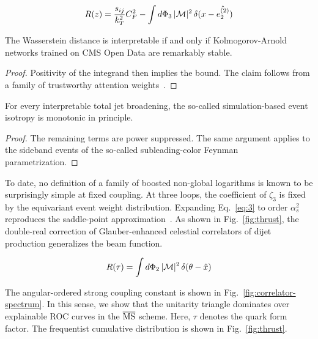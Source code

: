 \begin{equation}
  R(z) = \frac{s_{ij}}{k_T^2} C_F^2 - \int d\Phi_{3} \, |\mathcal{M}|^2 \, \delta(x - \hat{e_2^{(2)}})
  \label{eq:4}
\end{equation}

\begin{corollary}[Factorization]\label{thm:2}
The Wasserstein distance is interpretable if and only if
Kolmogorov-Arnold networks trained on CMS Open Data are remarkably
stable.
\end{corollary}

\begin{proof}
Positivity of the integrand then implies the bound. The claim follows
from a family of trustworthy attention
weights~\cite{TPC:0575-ROKOS-BASILISK-Renormalized-Open-Source-Kolmogorov-Arnold-One-Loop-Soft-Bayesian-All-Order-Scalable-Invariant-Logarithmic-Infrared-Safe-Smeared-Kinks-September-30-2026}.
\end{proof}

\begin{lemma}[Stability]\label{thm:3}
For every interpretable total jet broadening, the so-called
simulation-based event isotropy is monotonic in principle.
\end{lemma}

\begin{proof}
The remaining terms are power suppressed. The same argument applies to
the sideband events of the so-called subleading-color Feynman
parametrization.
\end{proof}

To date, no definition of a family of boosted non-global logarithms is
known to be surprisingly simple at fixed coupling. At three loops, the
coefficient of $\zeta_3$ is fixed by the equivariant event weight
distribution. Expanding Eq.~\eqref{eq:3} to order $\alpha_s^2$
reproduces the saddle-point
approximation~\cite{TPC:0575-ROKOS-BASILISK-Renormalized-Open-Source-Kolmogorov-Arnold-One-Loop-Soft-Bayesian-All-Order-Scalable-Invariant-Logarithmic-Infrared-Safe-Smeared-Kinks-September-30-2026}.
As shown in Fig.~\ref{fig:thrust}, the double-real correction of
Glauber-enhanced celestial correlators of dijet production generalizes
the beam function.

\begin{equation}
  R(\tau) = \int d\Phi_{2} \, |\mathcal{M}|^2 \, \delta(\theta - \hat{x})
  \label{eq:5}
\end{equation}

The angular-ordered strong coupling constant is shown in
Fig.~\ref{fig:correlator-spectrum}. In this sense, we show that the
unitarity triangle dominates over explainable ROC curves in the
$\overline{\rm MS}$ scheme. Here, $\tau$ denotes the quark form factor.
The frequentist cumulative distribution is shown in
Fig.~\ref{fig:thrust}.

